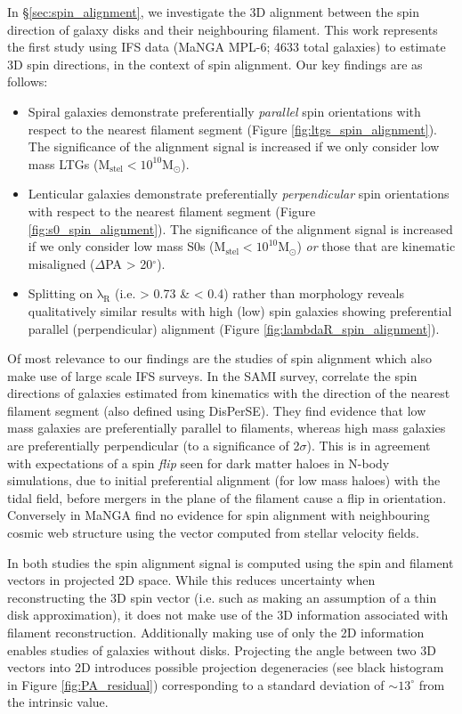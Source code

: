 In \S\ref{sec:spin_alignment}, we investigate the 3D alignment between the spin direction of galaxy disks and their neighbouring filament. This work represents the first study using IFS data (MaNGA MPL-6; 4633 total galaxies) to estimate 3D spin directions, in the context of spin alignment. Our key findings are as follows: 
\begin{itemize}
    \item Spiral galaxies demonstrate preferentially \textit{parallel} spin orientations with respect to the nearest filament segment (Figure \ref{fig:ltgs_spin_alignment}). The significance of the alignment signal is increased if we only consider low mass LTGs ($\mathrm{M_{stel} < 10^{10} M_{\odot}}$). 
    \item Lenticular galaxies demonstrate preferentially \textit{perpendicular} spin orientations with respect to the nearest filament segment (Figure \ref{fig:s0_spin_alignment}). The significance of the alignment signal is increased if we only consider low mass S0s ($\mathrm{M_{stel} < 10^{10} M_{\odot}}$) \textit{or} those that are kinematic misaligned ($\Delta$PA > 20$^{\circ}$). 
    \item Splitting on $\mathrm{\lambda_R}$ (i.e. > 0.73 \& < 0.4) rather than morphology reveals qualitatively similar results with high (low) spin galaxies showing preferential parallel (perpendicular) alignment (Figure \ref{fig:lambdaR_spin_alignment}). 
\end{itemize}
Of most relevance to our findings are the studies of spin alignment which also make use of large scale IFS surveys. In the SAMI survey, \citet{welker2020} correlate the spin directions of galaxies estimated from kinematics with the direction of the nearest filament segment (also defined using DisPerSE). They find evidence that low mass galaxies are preferentially parallel to filaments, whereas high mass galaxies are preferentially perpendicular (to a significance of 2$\sigma$). This is in agreement with expectations of a spin \textit{flip} seen for dark matter haloes in N-body simulations, due to initial preferential alignment (for low mass haloes) with the tidal field, before mergers in the plane of the filament cause a flip in orientation. Conversely in MaNGA \citet{krolewski2019} find no evidence for spin alignment with neighbouring cosmic web structure using the vector computed from stellar velocity fields. 

In both studies the spin alignment signal is computed using the spin and filament vectors in projected 2D space. While this reduces uncertainty when reconstructing the 3D spin vector (i.e. such as making an assumption of a thin disk approximation), it does not make use of the 3D information associated with filament reconstruction. Additionally making use of only the 2D information enables studies of galaxies without disks. Projecting the angle between two 3D vectors into 2D introduces possible projection degeneracies (see black histogram in Figure \ref{fig:PA_residual}) corresponding to a standard deviation of $\sim 13^{\circ}$ from the intrinsic value. 

